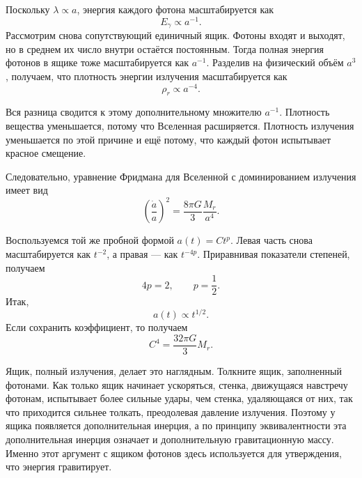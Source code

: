 Поскольку \(\lambda\propto a\), энергия каждого фотона масштабируется как
\begin{equation}
E_\gamma\propto a^{-1}.
\end{equation}
Рассмотрим снова сопутствующий единичный ящик. Фотоны входят и выходят, но в среднем их число внутри остаётся постоянным. Тогда полная энергия фотонов в ящике тоже масштабируется как \(a^{-1}\). Разделив на физический объём \(a^3\), получаем, что плотность энергии излучения масштабируется как
\begin{equation}
\rho_r\propto a^{-4}.
\end{equation}

Вся разница сводится к этому дополнительному множителю \(a^{-1}\). Плотность вещества уменьшается, потому что Вселенная расширяется. Плотность излучения уменьшается по этой причине и ещё потому, что каждый фотон испытывает красное смещение.

Следовательно, уравнение Фридмана для Вселенной с доминированием излучения имеет вид
\begin{equation}
\left(\frac{\dot a}{a}\right)^2=\frac{8\pi G}{3}\frac{M_r}{a^4}.
\end{equation}

Воспользуемся той же пробной формой \(a(t)=Ct^p\). Левая часть снова масштабируется как \(t^{-2}\), а правая — как \(t^{-4p}\). Приравнивая показатели степеней, получаем
\begin{equation}
4p=2,
\qquad
p=\frac{1}{2}.
\end{equation}
Итак,
\begin{equation}
a(t)\propto t^{1/2}.
\end{equation}
Если сохранить коэффициент, то получаем
\begin{equation}
C^4=\frac{32\pi G}{3}M_r.
\end{equation}

\begin{classroomqa}
\end{classroomqa}

Ящик, полный излучения, делает это наглядным. Толкните ящик, заполненный фотонами. Как только ящик начинает ускоряться, стенка, движущаяся навстречу фотонам, испытывает более сильные удары, чем стенка, удаляющаяся от них, так что приходится сильнее толкать, преодолевая давление излучения. Поэтому у ящика появляется дополнительная инерция, а по принципу эквивалентности эта дополнительная инерция означает и дополнительную гравитационную массу. Именно этот аргумент с ящиком фотонов здесь используется для утверждения, что энергия гравитирует.

